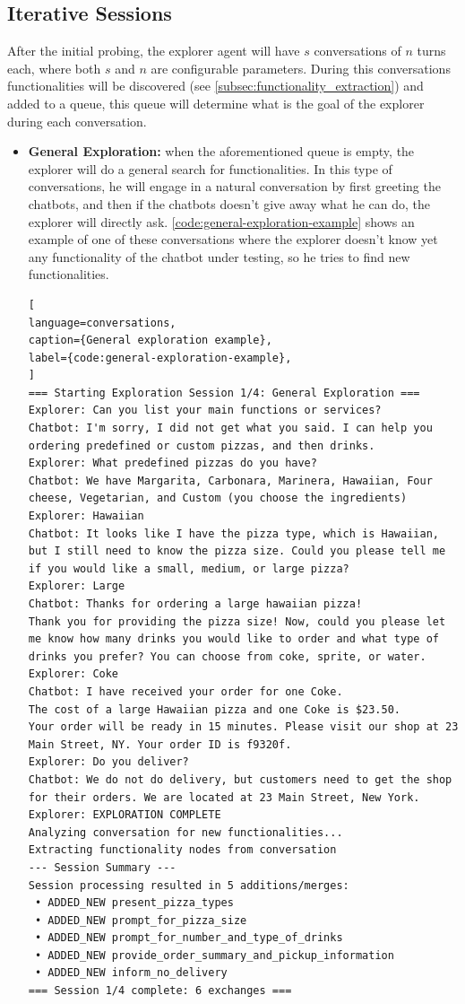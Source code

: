 \subsection{Iterative Sessions}

After the initial probing,
the explorer agent will have $s$ conversations of $n$ turns each,
where both $s$ and $n$ are configurable parameters.
During this conversations functionalities will be discovered
(see \autoref{subsec:functionality_extraction})
and added to a queue,
this queue will determine what is the goal of the explorer
during each conversation.

\begin{itemize}
  \item \textbf{General Exploration:}
    when the aforementioned queue is empty,
    the explorer will do a general search for functionalities.
    In this type of conversations,
    he will engage in a natural conversation by first greeting the chatbots,
    and then if the chatbots doesn't give away what he can do,
    the explorer will directly ask.
    \autoref{code:general-exploration-example}
    shows an example of one of these conversations
    where the explorer doesn't know yet any
    functionality of the chatbot under testing,
    so he tries to find new functionalities.

\begin{lstlisting}[
language=conversations,
caption={General exploration example},
label={code:general-exploration-example},
]
=== Starting Exploration Session 1/4: General Exploration ===
Explorer: Can you list your main functions or services?
Chatbot: I'm sorry, I did not get what you said. I can help you ordering predefined or custom pizzas, and then drinks.
Explorer: What predefined pizzas do you have?
Chatbot: We have Margarita, Carbonara, Marinera, Hawaiian, Four cheese, Vegetarian, and Custom (you choose the ingredients)
Explorer: Hawaiian
Chatbot: It looks like I have the pizza type, which is Hawaiian, but I still need to know the pizza size. Could you please tell me if you would like a small, medium, or large pizza?
Explorer: Large
Chatbot: Thanks for ordering a large hawaiian pizza!
Thank you for providing the pizza size! Now, could you please let me know how many drinks you would like to order and what type of drinks you prefer? You can choose from coke, sprite, or water.
Explorer: Coke
Chatbot: I have received your order for one Coke.
The cost of a large Hawaiian pizza and one Coke is $23.50.
Your order will be ready in 15 minutes. Please visit our shop at 23 Main Street, NY. Your order ID is f9320f.
Explorer: Do you deliver?
Chatbot: We do not do delivery, but customers need to get the shop for their orders. We are located at 23 Main Street, New York.
Explorer: EXPLORATION COMPLETE
Analyzing conversation for new functionalities...
Extracting functionality nodes from conversation
--- Session Summary ---
Session processing resulted in 5 additions/merges:
 • ADDED_NEW present_pizza_types
 • ADDED_NEW prompt_for_pizza_size
 • ADDED_NEW prompt_for_number_and_type_of_drinks
 • ADDED_NEW provide_order_summary_and_pickup_information
 • ADDED_NEW inform_no_delivery
=== Session 1/4 complete: 6 exchanges ===
\end{lstlisting}


\end{itemize}
